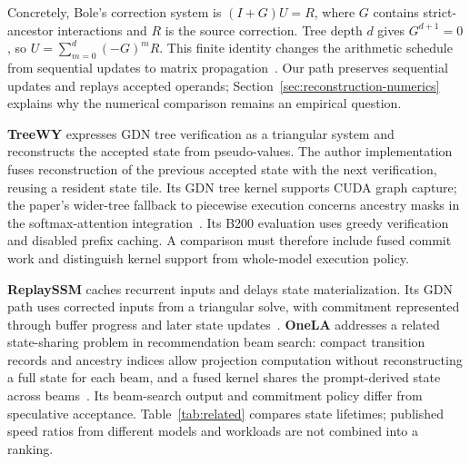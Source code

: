\documentclass[conference]{IEEEtran}
\begin{document}
Concretely, Bole's correction system is $(I+G)U=R$, where $G$ contains strict-ancestor interactions and $R$ is the source correction. Tree depth $d$ gives $G^{d+1}=0$, so $U=\sum_{m=0}^{d}(-G)^mR$. This finite identity changes the arithmetic schedule from sequential updates to matrix propagation~\cite{wang2026bole}. Our path preserves sequential updates and replays accepted operands; Section~\ref{sec:reconstruction-numerics} explains why the numerical comparison remains an empirical question.

\textbf{TreeWY} expresses GDN tree verification as a triangular system and reconstructs the accepted state from pseudo-values. The author implementation fuses reconstruction of the previous accepted state with the next verification, reusing a resident state tile. Its GDN tree kernel supports CUDA graph capture; the paper's wider-tree fallback to piecewise execution concerns ancestry masks in the softmax-attention integration~\cite{ghantasala2026treewy,ghantasala2026treewycode}. Its B200 evaluation uses greedy verification and disabled prefix caching. A comparison must therefore include fused commit work and distinguish kernel support from whole-model execution policy.

\textbf{ReplaySSM} caches recurrent inputs and delays state materialization. Its GDN path uses corrected inputs from a triangular solve, with commitment represented through buffer progress and later state updates~\cite{replayssm2026}. \textbf{OneLA} addresses a related state-sharing problem in recommendation beam search: compact transition records and ancestry indices allow projection computation without reconstructing a full state for each beam, and a fused kernel shares the prompt-derived state across beams~\cite{yang2026onela}. Its beam-search output and commitment policy differ from speculative acceptance. Table~\ref{tab:related} compares state lifetimes; published speed ratios from different models and workloads are not combined into a ranking.
\end{document}
